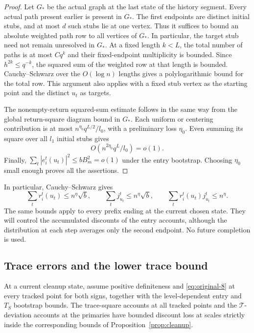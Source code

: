 \begin{proof}
Let $G_*$ be the actual graph at the last state of the history segment.
Every actual path present earlier is present in $G_*$.  The first
endpoints are distinct initial stubs, and at most $d$ such stubs lie
at one vertex.  Thus it suffices to bound an absolute weighted path
row to all vertices of $G_*$.  In particular, the target stub need not
remain unresolved in $G_*$.  At a fixed length $k<L$, the total
number of paths is at most $Cq^k$ and their fixed-endpoint
multiplicity is bounded.  Since $h^{2k}\leq q^{-k}$, the squared sum
of the weighted row at that length is bounded.  Cauchy--Schwarz over
the $O(\log n)$ lengths gives a polylogarithmic bound for the total
row.  This argument also applies with a fixed stub vertex as the
starting point and the distinct $u_t$ as targets.

The nonempty-return squared-sum estimate follows in the same way
from the global return-square diagram bound in $G_*$.  Each uniform
or centering contribution is at most
$n^{\eta_0}q^{L/2}/l_0$, with a preliminary loss $\eta_0$.
Even summing its square over all $l_1$ initial stubs gives
\[
 O\!\left(n^{2\eta_0}q^L/l_0\right)=o(1).
\]
Finally,
$\sum_t|e_i^t(u_t)|^2\leq bB_m^2=o(1)$ under the entry bootstrap.
Choosing $\eta_0$ small enough proves all the assertions.
\end{proof}

In particular, Cauchy--Schwarz gives
\[
 \sum_t r_i^t(u_t)\leq n^\eta\sqrt b,\qquad
 \sum_t j_{u_t}^t\leq n^\eta\sqrt b,\qquad
 \sum_t r_i^t(u_t)j_{u_t}^t\leq n^\eta.
\]
The same bounds apply to every prefix ending at the current chosen
state.  They will control the accumulated discounts of the entry
accounts, although the distribution at each step averages only the
second endpoint.  No future completion is used.

\subsection{Trace errors and the lower trace bound}

\begin{lemma}
\label{lem:cleanup-traces}
At a current cleanup state, assume positive definiteness and
\eqref{eq:original-8} at every tracked point for both signs, together
with the level-dependent entry and $T_S$ bootstrap bounds.
The trace-square accounts at all tracked points and the
$\mathcal T$-deviation accounts at the primaries have bounded discount
loss at scales strictly inside the corresponding bounds of
Proposition~\ref{prop:cleanup}.
\end{lemma}

